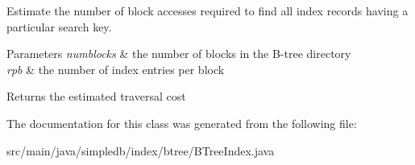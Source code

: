 Estimate the number of block accesses required to find all index records having a particular search key. 
\begin{DoxyParams}{Parameters}
{\em numblocks} & the number of blocks in the B-\/tree directory \\
\hline
{\em rpb} & the number of index entries per block \\
\hline
\end{DoxyParams}
\begin{DoxyReturn}{Returns}
the estimated traversal cost 
\end{DoxyReturn}


The documentation for this class was generated from the following file\+:\begin{DoxyCompactItemize}
\item 
src/main/java/simpledb/index/btree/B\+Tree\+Index.\+java\end{DoxyCompactItemize}
